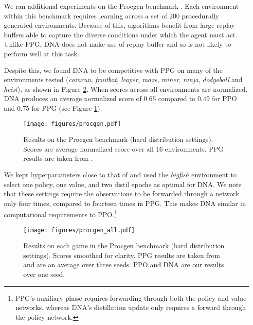 \documentclass{article}
\begin{document}
We ran additional experiments on the Procgen benchmark \cite{cobbe2020leveraging}. Each environment within this benchmark requires learning across a set of 200 procedurally generated environments. Because of this, algorithms benefit from large replay buffers able to capture the diverse conditions under which the agent must act. Unlike PPG, DNA does not make use of replay buffer and so is not likely to perform well at this task. 

Despite this, we found DNA to be competitive with PPG on many of the environments tested (\textit{coinrun}, \textit{fruitbot}, \textit{leaper}, \textit{maze}, \textit{miner}, \textit{ninja}, \textit{dodgeball} and \textit{heist}), as shown in Figure \ref{fig:procgen_all}. When scores across all environments are normalized, DNA produces an average normalized score of $0.65$ compared to $0.49$ for PPO and $0.75$ for PPG (see Figure \ref{fig:procgen}). 

\begin{figure}[h]
    \centering
    \texttt{[image: figures/procgen.pdf]}
    \caption{Results on the Procgen benchmark (hard distribution settings). Scores are average normalized score over all 16 environments. PPG results are taken from \cite{cobbe2021phasic}.}
    \label{fig:procgen}
\end{figure}

We kept hyperparameters close to that of \cite{cobbe2021phasic} and used the \textit{bigfish} environment to select one policy, one value, and two distil epochs as optimal for DNA. We note that these settings require the observations to be forwarded through a network only four times, compared to fourteen times in PPG. This makes DNA similar in computational requirements to PPO.\footnote{PPG's auxiliary phase requires forwarding through both the policy and value networks, whereas DNA's distillation update only requires a forward through the policy network.}

\begin{figure}[h]
    \centering
    \texttt{[image: figures/procgen\_all.pdf]}
    \caption{Results on each game in the Procgen benchmark (hard distribution settings). Scores smoothed for clarity. PPG results are taken from \cite{cobbe2021phasic} and are an average over three seeds. PPO and DNA are our results over one seed.}
    \label{fig:procgen_all}
\end{figure}
\end{document}
